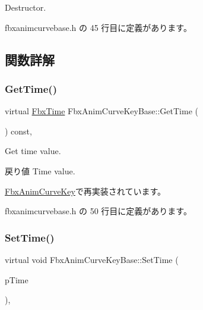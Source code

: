 Destructor. 

 fbxanimcurvebase.\+h の 45 行目に定義があります。



\subsection{関数詳解}
\mbox{\label{class_fbx_anim_curve_key_base_a3eebfd7bd2101f759269373a6c9343a2}} 
\subsubsection{\texorpdfstring{Get\+Time()}{GetTime()}}
{\footnotesize\ttfamily virtual \hyperlink{class_fbx_time}{Fbx\+Time} Fbx\+Anim\+Curve\+Key\+Base\+::\+Get\+Time (\begin{DoxyParamCaption}{ }\end{DoxyParamCaption}) const\hspace{0.3cm}{\ttfamily [inline]}, {\ttfamily [virtual]}}

Get time value. \begin{DoxyReturn}{戻り値}
Time value. 
\end{DoxyReturn}


\hyperlink{class_fbx_anim_curve_key_aae0882b53b31502cb30ea35de028837f}{Fbx\+Anim\+Curve\+Key}で再実装されています。



 fbxanimcurvebase.\+h の 50 行目に定義があります。

\mbox{\label{class_fbx_anim_curve_key_base_a1c8d15159d7b00280411c08f86c951ca}} 
\subsubsection{\texorpdfstring{Set\+Time()}{SetTime()}}
{\footnotesize\ttfamily virtual void Fbx\+Anim\+Curve\+Key\+Base\+::\+Set\+Time (\begin{DoxyParamCaption}\item[{const \hyperlink{class_fbx_time}{Fbx\+Time} \&}]{p\+Time }\end{DoxyParamCaption})\hspace{0.3cm}{\ttfamily [inline]}, {\ttfamily [virtual]}}

